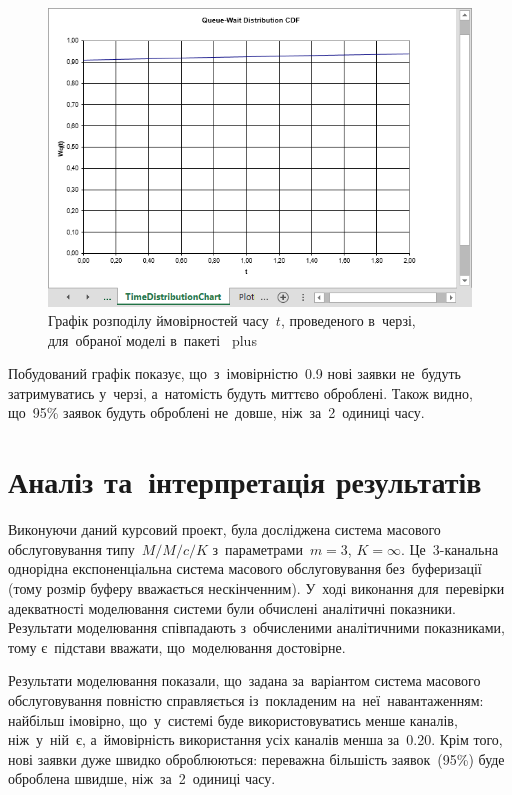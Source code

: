 \documentclass[
  ukrainian,
  simple,
  floatsection,
]{eskdnaukvd}
\begin{document}
      \begin{figure}[!htbp]
        \centering
        \includegraphics[height = 12 \baselineskip]{./assets/04-qts-model-res-graph-02.png}
        \caption{Графік розподілу ймовірностей часу~$t$, проведеного в~черзі, для~обраної моделі в~пакеті~\textenglish{ plus }}
        \label{fig:qts-time-distr-chart}
      \end{figure}

      Побудований графік показує, що~з~імовірністю~\num{0.9} нові заявки не~будуть затримуватись у~черзі, а~натомість будуть миттєво оброблені. Також видно, що~95\% заявок будуть оброблені не~довше, ніж~за~2~одиниці часу.

  \section{Аналіз та~інтерпретація результатів}
    Виконуючи даний курсовий проект, була досліджена система масового обслуговування типу~$M/M/c/K$ з~параметрами~$m = 3$, $K = \infty$. Це~3-канальна однорідна експоненціальна система масового обслуговування без~буферизації (тому розмір буферу вважається нескінченним). У~ході виконання для~перевірки адекватності моделювання системи були обчислені аналітичні показники. Результати моделювання співпадають з~обчисленими аналітичними показниками, тому є~підстави вважати, що~моделювання достовірне.

    Результати моделювання показали, що~задана за~варіантом система масового обслуговування повністю справляється із~покладеним на~неї~навантаженням: найбільш імовірно, що~у~системі буде використовуватись менше каналів, ніж~у~ній~є, а~ймовірність використання усіх каналів менша за~\num{0.20}. Крім того, нові заявки дуже швидко оброблюються: переважна більшість заявок~(95\%) буде оброблена швидше, ніж~за~2~одиниці часу.
\end{document}
